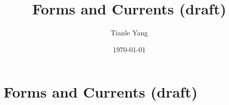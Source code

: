 \documentclass{noteformyself}
\title{Forms and Currents (draft)}
\author{Tianle Yang}
\date{\today}
\begin{document}
    \maketitle
    \section{Forms and Currents (draft)}




\end{document}
